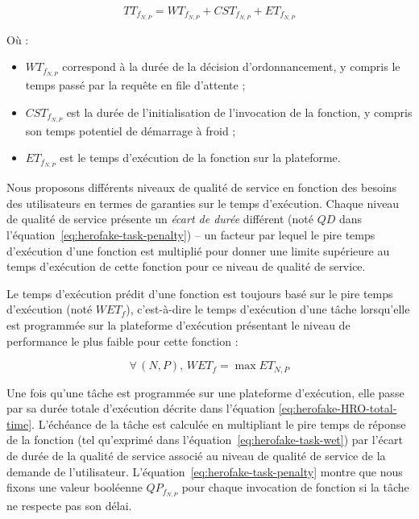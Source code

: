 \begin{equation}
    {TT}_{{f}_{N, P}} = {WT}_{{f}_{N, P}} + {CST}_{{f}_{N, P}} + {ET}_{{f}_{N, P}}
\label{eq:herofake-HRO-total-time}
\end{equation}

Où :

\begin{itemize}
    \item ${WT}_{{f}_{N, P}}$ correspond à la durée de la décision d'ordonnancement, y compris le temps passé par la requête en file d'attente ;
    \item ${CST}_{{f}_{N, P}}$ est la durée de l'initialisation de l'invocation de la fonction, y compris son temps potentiel de démarrage à froid ;
    \item ${ET}_{{f}_{N, P}}$ est le temps d'exécution de la fonction sur la plateforme.
\end{itemize}

Nous proposons différents niveaux de qualité de service en fonction des besoins des utilisateurs en termes de garanties sur le temps d'exécution. Chaque niveau de qualité de service présente un \textit{écart de durée} différent (noté $QD$ dans l'équation~\ref{eq:herofake-task-penalty}) -- un facteur par lequel le pire temps d'exécution d'une fonction est multiplié pour donner une limite supérieure au temps d'exécution de cette fonction pour ce niveau de qualité de service.

Le temps d'exécution prédit d'une fonction est toujours basé sur le pire temps d'exécution (noté $WET_{f}$), c'est-à-dire le temps d'exécution d'une tâche lorsqu'elle est programmée sur la plateforme d'exécution présentant le niveau de performance le plus faible pour cette fonction :


\begin{equation}
    \forall \, (N, P), \, WET_{f} = \max ET_{N, P}
\label{eq:herofake-task-wet}
\end{equation}

Une fois qu'une tâche est programmée sur une plateforme d'exécution, elle passe par sa durée totale d'exécution décrite dans l'équation \ref{eq:herofake-HRO-total-time}. L'échéance de la tâche est calculée en multipliant le pire temps de réponse de la fonction (tel qu'exprimé dans l'équation~\ref{eq:herofake-task-wet}) par l'écart de durée de la qualité de service associé au niveau de qualité de service de la demande de l'utilisateur. L'équation~\ref{eq:herofake-task-penalty} montre que nous fixons une valeur booléenne $QP_{f_{N, P}}$ pour chaque invocation de fonction si la tâche ne respecte pas son délai. 


